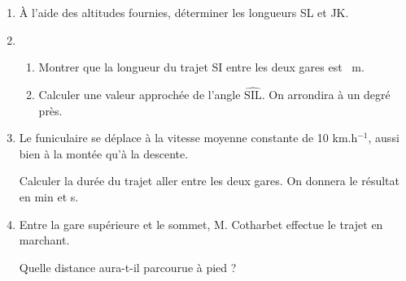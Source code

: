 \begin{enumerate}
\item À l'aide des altitudes fournies, déterminer les longueurs SL et JK. 
\item  
	\begin{enumerate}
		\item Montrer que la longueur du trajet SI entre les deux gares est ~m. 
		\item Calculer une valeur approchée de l'angle $\widehat{\text{SIL}}$. On arrondira à un degré près.
 	\end{enumerate} 
\item Le funiculaire se déplace à la vitesse moyenne constante de 10 km.h$^{-1}$, aussi bien à la montée qu'à la descente. 

Calculer la durée du trajet aller entre les deux gares. On donnera le résultat en min et s. 
\item Entre la gare supérieure et le sommet, M. Cotharbet effectue le trajet en marchant. 

Quelle distance aura-t-il parcourue à pied ? 
\end{enumerate}

\bigskip

